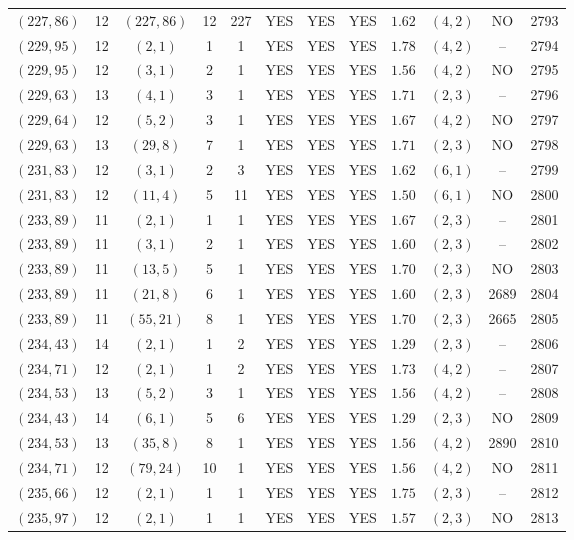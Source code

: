 \begin{longtable}{|c|c|c|c|c|c|c|c|c|c|c|c|}
$(227,86)$ & 12 & $(227,86)$ & 12 & 227 & YES & YES & YES & $1.62$ & $(4,2)$ & NO & 2793\\
$(229,95)$ & 12 & $(2,1)$ & 1 & 1 & YES & YES & YES & $1.78$ & $(4,2)$ & -- & 2794\\
$(229,95)$ & 12 & $(3,1)$ & 2 & 1 & YES & YES & YES & $1.56$ & $(4,2)$ & NO & 2795\\
$(229,63)$ & 13 & $(4,1)$ & 3 & 1 & YES & YES & YES & $1.71$ & $(2,3)$ & -- & 2796\\
$(229,64)$ & 12 & $(5,2)$ & 3 & 1 & YES & YES & YES & $1.67$ & $(4,2)$ & NO & 2797\\
$(229,63)$ & 13 & $(29,8)$ & 7 & 1 & YES & YES & YES & $1.71$ & $(2,3)$ & NO & 2798\\
$(231,83)$ & 12 & $(3,1)$ & 2 & 3 & YES & YES & YES & $1.62$ & $(6,1)$ & -- & 2799\\
$(231,83)$ & 12 & $(11,4)$ & 5 & 11 & YES & YES & YES & $1.50$ & $(6,1)$ & NO & 2800\\
$(233,89)$ & 11 & $(2,1)$ & 1 & 1 & YES & YES & YES & $1.67$ & $(2,3)$ & -- & 2801\\
$(233,89)$ & 11 & $(3,1)$ & 2 & 1 & YES & YES & YES & $1.60$ & $(2,3)$ & -- & 2802\\
$(233,89)$ & 11 & $(13,5)$ & 5 & 1 & YES & YES & YES & $1.70$ & $(2,3)$ & NO & 2803\\
$(233,89)$ & 11 & $(21,8)$ & 6 & 1 & YES & YES & YES & $1.60$ & $(2,3)$ & 2689 & 2804\\
$(233,89)$ & 11 & $(55,21)$ & 8 & 1 & YES & YES & YES & $1.70$ & $(2,3)$ & 2665 & 2805\\
$(234,43)$ & 14 & $(2,1)$ & 1 & 2 & YES & YES & YES & $1.29$ & $(2,3)$ & -- & 2806\\
$(234,71)$ & 12 & $(2,1)$ & 1 & 2 & YES & YES & YES & $1.73$ & $(4,2)$ & -- & 2807\\
$(234,53)$ & 13 & $(5,2)$ & 3 & 1 & YES & YES & YES & $1.56$ & $(4,2)$ & -- & 2808\\
$(234,43)$ & 14 & $(6,1)$ & 5 & 6 & YES & YES & YES & $1.29$ & $(2,3)$ & NO & 2809\\
$(234,53)$ & 13 & $(35,8)$ & 8 & 1 & YES & YES & YES & $1.56$ & $(4,2)$ & 2890 & 2810\\
$(234,71)$ & 12 & $(79,24)$ & 10 & 1 & YES & YES & YES & $1.56$ & $(4,2)$ & NO & 2811\\
$(235,66)$ & 12 & $(2,1)$ & 1 & 1 & YES & YES & YES & $1.75$ & $(2,3)$ & -- & 2812\\
$(235,97)$ & 12 & $(2,1)$ & 1 & 1 & YES & YES & YES & $1.57$ & $(2,3)$ & NO & 2813\\

\end{longtable}
